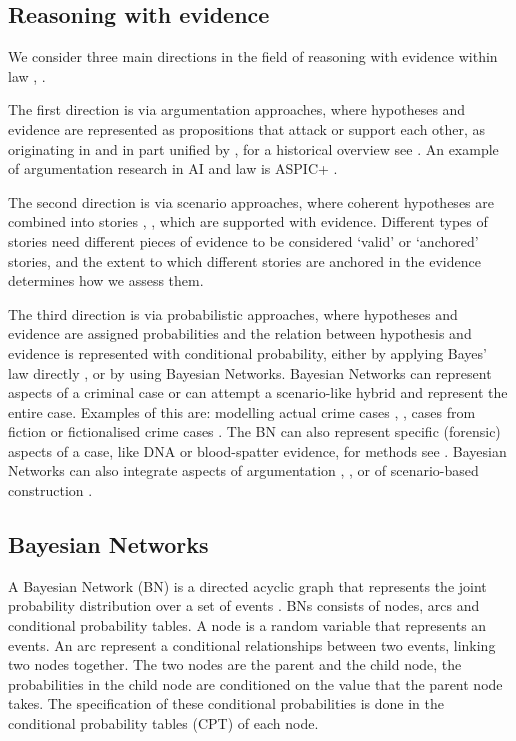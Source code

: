 \documentclass[12pt]{article}
\begin{document}
\subsection{Reasoning with evidence}
We consider three main directions in the field of reasoning with evidence within law \citep{Verheij2015}, \citep{diBelloVerheij2018}. 

The first direction is via argumentation approaches, where hypotheses and evidence are represented as propositions that attack or support each other, as originating in \citep{wigmore1931} and in part unified by \citet{dung1995}, for a historical overview see \citep{benchcapon2019}. An example of argumentation research in AI and law is ASPIC+ \citep{prakkenEtal2013}. 

The second direction is via scenario approaches, where coherent hypotheses are combined into stories \citep{penningtonHastie1993}, \citep{wagenaar1993}, which are supported with evidence. Different types of stories need different pieces of evidence to be considered `valid' or `anchored' stories, and the extent to which different stories are anchored in the evidence determines how we assess them. 

The third direction is via probabilistic approaches, where hypotheses and evidence are assigned probabilities and the relation between hypothesis and evidence is represented with conditional probability, either by applying Bayes' law directly \citep{dahlman2020}, or by using Bayesian Networks. Bayesian Networks can represent aspects of a criminal case or can attempt a scenario-like hybrid and represent the entire case. Examples of this are: modelling actual crime cases \citep{kadaneSchum1996}, \citep{Fenton2019},  cases from fiction \citep{Fenton2012} or fictionalised crime cases \citep{vanLeeuwen2019}. The BN can also represent specific (forensic) aspects of a case, like DNA or blood-spatter evidence, for methods see \citep{Meester2021}. Bayesian Networks can also integrate aspects of argumentation \citep{wieten2019}, \citep{timmer2016}, or of scenario-based construction \citep{vlek2016}.



\subsection{Bayesian Networks}

A Bayesian Network (BN) is a directed acyclic graph that represents the joint probability distribution over a set of events \citep{pearl1988b}. BNs consists of nodes, arcs and conditional probability tables. A node is a random variable that represents an events. An arc represent a conditional relationships between two events, linking two nodes together. The two nodes are the parent and the child node, the probabilities in the child node are conditioned on the value that the parent node takes. The specification of these conditional probabilities is done in the conditional probability tables (CPT) of each node.
\end{document}
